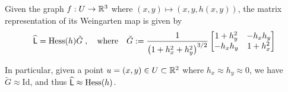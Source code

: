        	\begin{theorem}
        	Given the graph $f: U \to \mathbb{R}^3$ where $(x,y) \mapsto (x, y, h(x,y))$, the matrix
        	representation of its Weingarten map is given by
        	\begin{equation} \label{weinmatexactgraph}
        	\widehat{\mathsf{L}} = \mathrm{Hess}(h) \tilde{G} \;,\quad \mathrm{where} \quad
	        	\tilde{G} := \frac{1}{\left({1+h_x^2 + h_y^2}\right)^{3/2}}
	        	\begin{bmatrix}
		        	1 + h_y^2 & -h_x h_y \\
		        	-h_x h_y & 1 + h_x^2 \\
	        	\end{bmatrix} 
        	\end{equation}
        	
        	In particular, given a point $u = (x,y) \in U \subset \mathbb{R}^2$ where $h_x \approx h_y \approx 0$, we
        	have $\tilde{G} \approx \mathrm{Id}$, and thus $\widehat{\mathsf{L}} \approx \mathrm{Hess}(h)$.
        	
       	\end{theorem}
